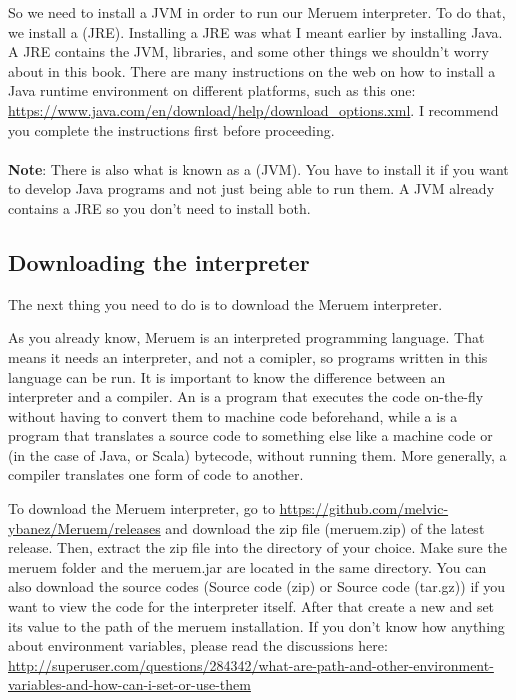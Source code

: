 So we need to install a JVM in order to run our Meruem interpreter. To do that, we install a  (JRE). Installing a JRE was what I meant earlier by installing Java. A JRE contains the JVM, libraries, and some other things we shouldn't worry about in this book. There are many instructions on the web on how to install a Java runtime environment on different platforms, such as this one: \url{ https://www.java.com/en/download/help/download_options.xml}. I recommend you complete the instructions first before proceeding.
\\~\\
\textbf{Note}: There is also what is known as a  (JVM). You have to install it if you want to develop Java programs and not just being able to run them. A JVM already contains a JRE so you don't need to install both.

\subsection{Downloading the interpreter}
The next thing you need to do is to download the Meruem interpreter. 

As you already know, Meruem is an interpreted programming language. That means it needs an interpreter, and not a comipler, so programs written in this language can be run. It is important to know the difference between an interpreter and a compiler. An  is a program that executes the code on-the-fly without having to convert them to machine code beforehand, while a  is a program that translates a source code to something else like a machine code or (in the case of Java, or Scala) bytecode, without running them. More generally, a compiler translates one form of code to another.

To download the Meruem interpreter, go to \url{https://github.com/melvic-ybanez/Meruem/releases} and download the zip file (meruem.zip) of the latest release. Then, extract the zip file into the directory of your choice. Make sure the meruem folder and the meruem.jar are located in the same directory. You can also download the source codes (Source code (zip) or Source code (tar.gz)) if you want to view the code for the interpreter itself. After that create a new   and set its value to the path of the meruem installation. If you don't know how anything about environment variables, please read the discussions here: \url{http://superuser.com/questions/284342/what-are-path-and-other-environment-variables-and-how-can-i-set-or-use-them}

